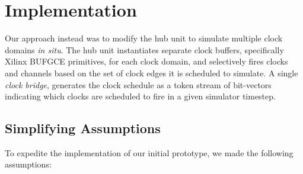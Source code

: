 

\section{Implementation}

Our approach instead was to modify the hub unit to simulate multiple clock
domains \emph{in situ}. The hub unit instantiates separate clock buffers, specifically Xilinx BUFGCE primitives, for
each clock domain, and selectively fires clocks and channels based on the set
of clock edges it is scheduled to simulate. A single \emph{clock bridge},
generates the clock schedule as a token stream of bit-vectors indicating which
clocks are scheduled to fire in a given simulator timestep.

\subsection{Simplifying Assumptions}\label{sec:static-multiclock-assumptions}


To expedite the implementation of our initial prototype, we made the following assumptions:

